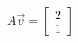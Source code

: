 \documentclass[preview]{standalone}
\begin{document}
\begin{align*}
A\vec{v} = \begin{bmatrix} 2 \\ 1 \end{bmatrix}
\end{align*}
\end{document}
